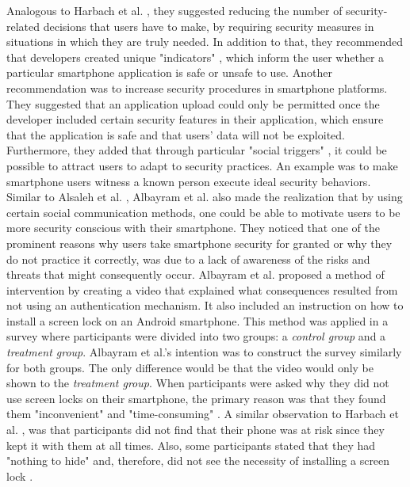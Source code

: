 Analogous to Harbach et al. \cite{harbach}, they suggested reducing the number of security-related decisions that users have to make, by requiring security measures in situations in which they are truly needed. In addition to that, they recommended that developers created unique "indicators" \cite{Alsaleh}, which inform the user whether a particular smartphone application is safe or unsafe to use. Another recommendation was to increase security procedures in smartphone platforms. They suggested that an application upload could only be permitted once the developer included certain security features in their application, which ensure that the application is safe and that users' data will not be exploited. Furthermore, they added that through particular "social triggers" \cite{Alsaleh}, it could be possible to attract users to adapt to security practices. An example was to make smartphone users witness a known person execute ideal security behaviors. \\

Similar to Alsaleh et al. \cite{Alsaleh}, Albayram et al. \cite{Albayram:2017:BUL:3235924.3235929} also made the realization that by using certain social communication methods, one could be able to motivate users to be more security conscious with their smartphone. They noticed that one of the prominent reasons why users take smartphone security for granted or why they do not practice it correctly, was due to a lack of awareness of the risks and threats that might consequently occur. Albayram et al. \cite{Albayram:2017:BUL:3235924.3235929} proposed a method of intervention by creating a video that explained what consequences resulted from not using an authentication mechanism. It also included an instruction on how to install a screen lock on an Android smartphone. This method was applied in a survey where participants were divided into two groups: a \textit{control group} and a \textit{treatment group}. Albayram et al.'s \cite{Albayram:2017:BUL:3235924.3235929} intention was to construct the survey similarly for both groups. The only difference would be that the video would only be shown to the \textit{treatment group}. When participants were asked why they did not use screen locks on their smartphone, the primary reason was that they found them "inconvenient" and "time-consuming" \cite{Albayram:2017:BUL:3235924.3235929}. A similar observation to Harbach et al. \cite{harbach}, was that participants did not find that their phone was at risk since they kept it with them at all times. Also, some participants stated that they had "nothing to hide" and, therefore, did not see the necessity of installing a screen lock \cite{Albayram:2017:BUL:3235924.3235929}.\\

